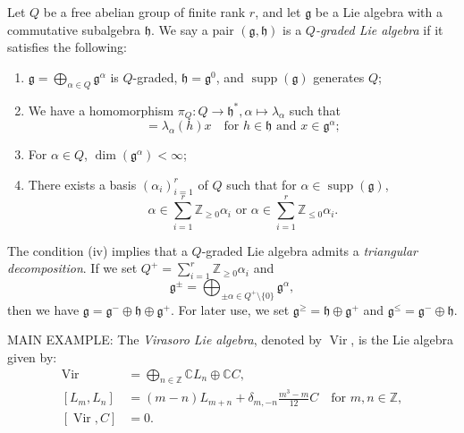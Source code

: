 \documentclass[a4paper, 12pt, reqno]{amsart}
\DeclareMathOperator{\Vir}{Vir}
\DeclareMathOperator{\supp}{supp}
\begin{document}
Let $Q$ be a free abelian group of finite rank $r$, and let $\mathfrak{g}$ be a Lie algebra with a commutative subalgebra $\mathfrak{h}$.
We say a pair $(\mathfrak{g}, \mathfrak{h})$ is a \emph{$Q$-graded Lie algebra} if it satisfies the following:
\begin{enumerate}
\item $\mathfrak{g} = \bigoplus_{\alpha \in Q}\mathfrak{g}^{\alpha}$ is $Q$-graded, $\mathfrak{h} = \mathfrak{g}^0$, and $\supp(\mathfrak{g})$ generates $Q$;
\item We have a homomorphism $\pi_Q: Q \to \mathfrak{h}^*, \alpha \mapsto \lambda_{\alpha}$ such  that
  \begin{equation*}
    [h, x] = \lambda_{\alpha}(h)x \quad \text{for $h \in \mathfrak{h}$ and $x \in \mathfrak{g}^{\alpha}$};
  \end{equation*}
\item For $\alpha \in Q$, $\dim(\mathfrak{g}^{\alpha}) < \infty$;
\item There exists a basis $(\alpha_i)_{i = 1}^r$ of $Q$ such that for $\alpha \in \supp(\mathfrak{g})$,
  \begin{equation*}
    \text{$\alpha \in \sum_{i = 1}^r\mathbb{Z}_{\ge 0}\alpha_i$ or $\alpha \in \sum_{i = 1}^r\mathbb{Z}_{\le 0}\alpha_i$}.
  \end{equation*}
\end{enumerate}

The condition (iv) implies that a $Q$-graded Lie algebra admits a \emph{triangular decomposition}.
If we set $Q^+ = \sum_{i = 1}^r\mathbb{Z}_{\ge 0}\alpha_i$ and
\begin{equation*}
  \mathfrak{g}^{\pm} = \bigoplus_{\pm \alpha \in Q^+ \setminus \{0\}}\mathfrak{g}^{\alpha},
\end{equation*}
then we have $\mathfrak{g} = \mathfrak{g}^- \oplus \mathfrak{h} \oplus \mathfrak{g}^+$.
For later use, we set $\mathfrak{g}^{\ge} = \mathfrak{h} \oplus \mathfrak{g}^+$ and $\mathfrak{g}^{\le} = \mathfrak{g}^- \oplus \mathfrak{h}$.

MAIN EXAMPLE: The \emph{Virasoro Lie algebra}, denoted by $\Vir$, is the Lie algebra given by:
\begin{align*}
  \Vir &= \bigoplus_{n \in \mathbb{Z}}\mathbb{C}L_n \oplus \mathbb{C}C, \\
  [L_m, L_n] &= (m - n)L_{m + n} + \delta_{m, -n}\frac{m^3 - m}{12}C \quad \text{for $m, n \in \mathbb{Z}$}, \\
  [\Vir, C] &= 0.
\end{align*}
\end{document}
